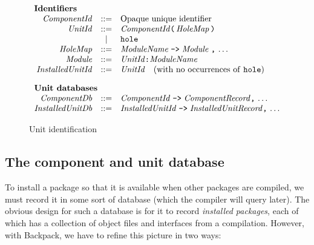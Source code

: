 \documentclass{article}
\newcommand{\I}[1]{\ensuremath{\mathit{#1}}}
\begin{document}
\begin{figure}[htpb]
$$
\begin{array}{rcll}
\multicolumn{3}{l}{\mbox{\bf Identifiers}} \\
  \I{ComponentId} & ::= & \mbox{Opaque unique identifier}  \\
  \I{UnitId} & ::= & \I{ComponentId} \verb|(|\, \I{HoleMap}\, \verb|)|  \\
              & | & \verb|hole| \\
  \I{HoleMap} & ::= & \I{ModuleName}\; \verb|->|\; \I{Module}\; \verb|,|\, \ldots \\
  \I{Module} & ::= & \I{UnitId} \verb|:| \I{ModuleName}  \\
  \I{InstalledUnitId} & ::= & \I{UnitId} \quad \mbox{(with no occurrences of \texttt{hole})} \\[1em]
\multicolumn{3}{l}{\mbox{\bf Unit databases}} \\
  \I{ComponentDb} & ::= & \I{ComponentId} \; \verb|->| \; \I{ComponentRecord} \verb|,|\, \ldots \\
  \I{InstalledUnitDb} & ::= & \I{InstalledUnitId} \; \verb|->| \; \I{InstalledUnitRecord} \verb|,|\, \ldots \\
\end{array}
$$
\caption{Unit identification} \label{fig:ids}
\end{figure}

\subsection{The component and unit database}

To install a package so that it is available when other packages are compiled,
we must record it in some sort of database (which the compiler will query later).
The obvious design for such a database is for it to record \emph{installed packages},
each of which has a collection of object files and interfaces from a compilation.
However, with Backpack, we have to refine this picture in two ways:
\end{document}
